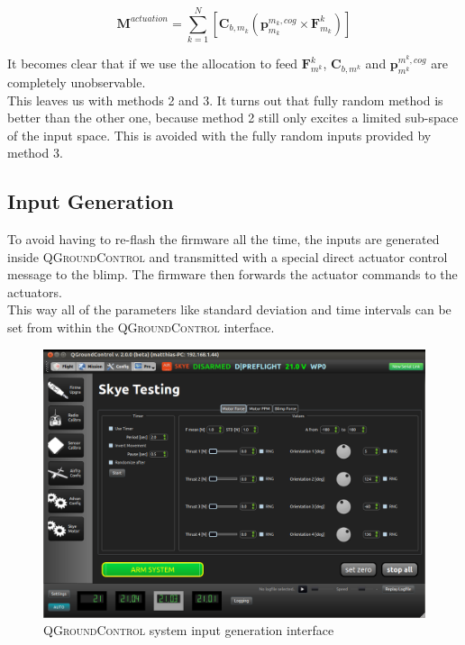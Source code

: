 \begin{equation}
\label{eq:m_actuation}
\mathbf{M}^{actuation} = \sum_{k=1}^N  \left[  \mathbf{C}_{b,m_k} \left( \mathbf{p}^{m_k,cog}_{m_k} \times \mathbf{F}^k_{m_k} \right)  \right]
\end{equation}

It becomes clear that if we use the allocation to feed $\mathbf{F}^k_{m^k}$, $\mathbf{C}_{b,m^k}$ and $\mathbf{p}^{m^k,cog}_{m^k}$ are completely unobservable.\\

This leaves us with methods 2 and 3.
It turns out that fully random method is better than the other one, because method 2 still only excites a limited sub-space of the input space. This is avoided with the fully random inputs provided by method 3.\\

\subsection{Input Generation}
\label{sub:input_generation}
To avoid having to re-flash the firmware all the time, the inputs are generated inside \textsc{QGroundControl} and transmitted with a special direct actuator control message to the blimp.
The firmware then forwards the actuator commands to the actuators. \\
This way all of the parameters like standard deviation and time intervals can be set from within the \textsc{QGroundControl} interface.

\begin{figure}[hbtp]
\centering
\includegraphics[width=.9\linewidth]{images/qgc/QGroundControl_v_2.png}
\caption{\textsc{QGroundControl} system input generation interface}
\label{fig:qgc_input_gen}
\end{figure}

